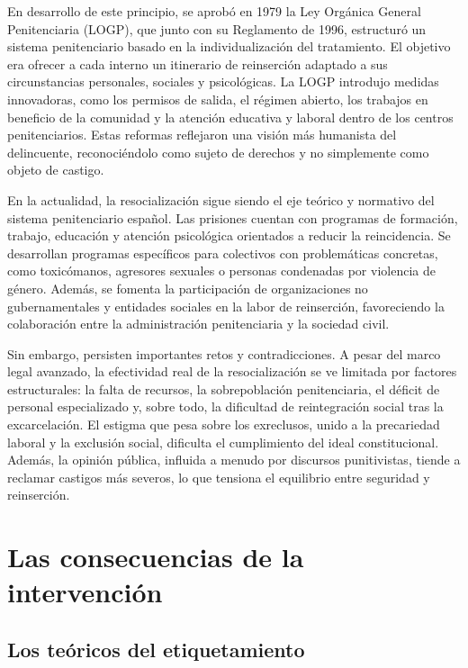 \documentclass[
  spanish,
  letterpaper,
  DIV=11,
  numbers=noendperiod]{scrreprt}
\begin{document}
\begin{tcolorbox}
En desarrollo de este principio, se aprobó en 1979 la Ley Orgánica
General Penitenciaria (LOGP), que junto con su Reglamento de 1996,
estructuró un sistema penitenciario basado en la individualización del
tratamiento. El objetivo era ofrecer a cada interno un itinerario de
reinserción adaptado a sus circunstancias personales, sociales y
psicológicas. La LOGP introdujo medidas innovadoras, como los permisos
de salida, el régimen abierto, los trabajos en beneficio de la comunidad
y la atención educativa y laboral dentro de los centros penitenciarios.
Estas reformas reflejaron una visión más humanista del delincuente,
reconociéndolo como sujeto de derechos y no simplemente como objeto de
castigo.

En la actualidad, la resocialización sigue siendo el eje teórico y
normativo del sistema penitenciario español. Las prisiones cuentan con
programas de formación, trabajo, educación y atención psicológica
orientados a reducir la reincidencia. Se desarrollan programas
específicos para colectivos con problemáticas concretas, como
toxicómanos, agresores sexuales o personas condenadas por violencia de
género. Además, se fomenta la participación de organizaciones no
gubernamentales y entidades sociales en la labor de reinserción,
favoreciendo la colaboración entre la administración penitenciaria y la
sociedad civil.

Sin embargo, persisten importantes retos y contradicciones. A pesar del
marco legal avanzado, la efectividad real de la resocialización se ve
limitada por factores estructurales: la falta de recursos, la
sobrepoblación penitenciaria, el déficit de personal especializado y,
sobre todo, la dificultad de reintegración social tras la excarcelación.
El estigma que pesa sobre los exreclusos, unido a la precariedad laboral
y la exclusión social, dificulta el cumplimiento del ideal
constitucional. Además, la opinión pública, influida a menudo por
discursos punitivistas, tiende a reclamar castigos más severos, lo que
tensiona el equilibrio entre seguridad y reinserción.

\end{tcolorbox}

\section{Las consecuencias de la
intervención}\label{las-consecuencias-de-la-intervenciuxf3n}

\subsection{Los teóricos del
etiquetamiento}\label{los-teuxf3ricos-del-etiquetamiento}
\end{document}
